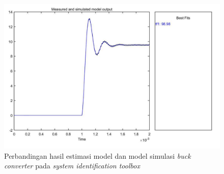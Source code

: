 \documentclass[../main.tex]{subfiles}
\begin{document}
            \begin{figure}[H]
                \centering
                \includegraphics[width = \textwidth]{assets/image/MODEL_OUTPUT-cropped.pdf}
                \caption{Perbandingan hasil estimasi model dan model simulasi \textit{buck converter} pada \textit{system identification toolbox}}
                \label{perbandingan_simscape_ident}
            \end{figure}
\end{document}
